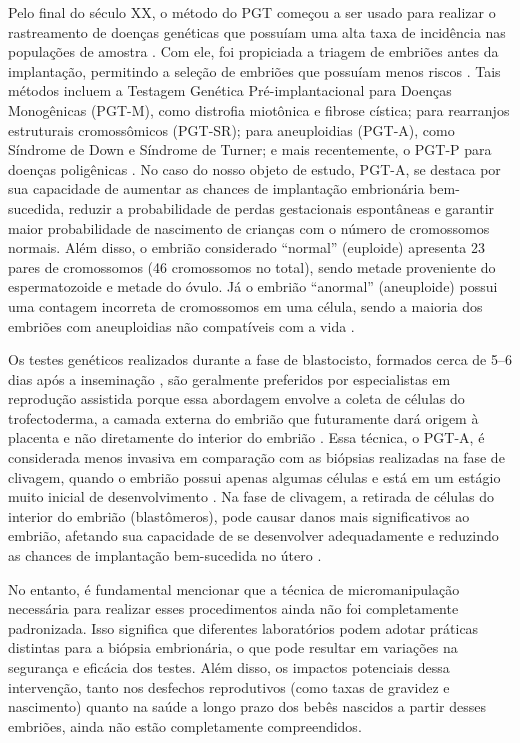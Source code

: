 Pelo final do século XX, o método do PGT começou a ser usado para realizar o rastreamento de doenças genéticas que possuíam uma alta taxa de incidência nas populações de amostra \cite{yang2024}. Com ele, foi propiciada a triagem de embriões antes da implantação, permitindo a seleção de embriões que possuíam menos riscos \cite{yang2024}. Tais métodos incluem a Testagem Genética Pré-implantacional para Doenças Monogênicas (PGT-M), como distrofia miotônica e fibrose cística; para rearranjos estruturais cromossômicos (PGT-SR); para aneuploidias (PGT-A), como Síndrome de Down e Síndrome de Turner; e mais recentemente, o PGT-P para doenças poligênicas \cite{yang2024}. No caso do nosso objeto de estudo, PGT-A, se destaca por sua capacidade de aumentar as chances de implantação embrionária bem-sucedida, reduzir a probabilidade de perdas gestacionais espontâneas e garantir maior probabilidade de nascimento de crianças com o número de cromossomos normais\cite{yang2024}. Além disso, o embrião considerado “normal” (euploide) apresenta 23 pares de cromossomos (46 cromossomos no total), sendo metade proveniente do espermatozoide e metade do óvulo. Já o embrião “anormal” (aneuploide) possui uma contagem incorreta de cromossomos em uma célula, sendo a maioria dos embriões com aneuploidias não compatíveis com a vida \cite{zegers2017}.

Os testes genéticos realizados durante a fase de blastocisto, formados cerca de 5{–}6 dias após a inseminação \cite{zegers2017}, são geralmente preferidos por especialistas em reprodução assistida porque essa abordagem envolve a coleta de células do trofectoderma, a camada externa do embrião que futuramente dará origem à placenta e não diretamente do interior do embrião \cite{leaver2019}. Essa técnica, o PGT-A, é considerada menos invasiva em comparação com as biópsias realizadas na fase de clivagem, quando o embrião possui apenas algumas células e está em um estágio muito inicial de desenvolvimento \cite{leaver2019}. Na fase de clivagem, a retirada de células do interior do embrião (blastômeros), pode causar danos mais significativos ao embrião, afetando sua capacidade de se desenvolver adequadamente e reduzindo as chances de implantação bem-sucedida no útero \cite{leaver2019}. 

No entanto, é fundamental mencionar que a técnica de micromanipulação necessária para realizar esses procedimentos ainda não foi completamente padronizada. Isso significa que diferentes laboratórios podem adotar práticas distintas para a biópsia embrionária, o que pode resultar em variações na segurança e eficácia dos testes. Além disso, os impactos potenciais dessa intervenção, tanto nos desfechos reprodutivos (como taxas de gravidez e nascimento) quanto na saúde a longo prazo dos bebês nascidos a partir desses embriões, ainda não estão completamente compreendidos.

